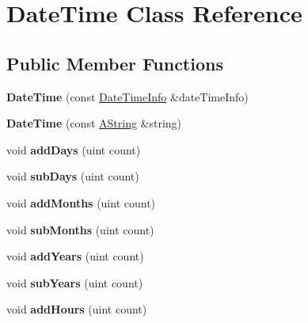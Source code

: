 \hypertarget{class_date_time}{}\section{Date\+Time Class Reference}
\label{class_date_time}
\subsection*{Public Member Functions}
\begin{DoxyCompactItemize}
\item 
\mbox{\label{class_date_time_acae25c3bcabd5636220ab73b4794b90e}} 
{\bfseries Date\+Time} (const \mbox{\hyperlink{struct_date_time_info}{Date\+Time\+Info}} \&date\+Time\+Info)
\item 
\mbox{\label{class_date_time_aae5852ec64aa634b1e4a81effb7df049}} 
{\bfseries Date\+Time} (const \mbox{\hyperlink{class_a_string}{A\+String}} \&string)
\item 
\mbox{\label{class_date_time_a9209722e2520862295252b12947d0f97}} 
void {\bfseries add\+Days} (uint count)
\item 
\mbox{\label{class_date_time_a8b49589808773b2bb330bc5414deae76}} 
void {\bfseries sub\+Days} (uint count)
\item 
\mbox{\label{class_date_time_a07122467e69f11dd79a615af9c5097d1}} 
void {\bfseries add\+Months} (uint count)
\item 
\mbox{\label{class_date_time_a2030620c1d44592ee63d92a7f1161c26}} 
void {\bfseries sub\+Months} (uint count)
\item 
\mbox{\label{class_date_time_a831ab5e9d50c8157ee0c23dc292b8ef5}} 
void {\bfseries add\+Years} (uint count)
\item 
\mbox{\label{class_date_time_a94bd3c5a6d9875368ba1795dedac8588}} 
void {\bfseries sub\+Years} (uint count)
\item 
\mbox{\label{class_date_time_aa4ba03bfc47a41d0fcbf5087908fe7ab}} 
void {\bfseries add\+Hours} (uint count)

\end{DoxyCompactItemize}
